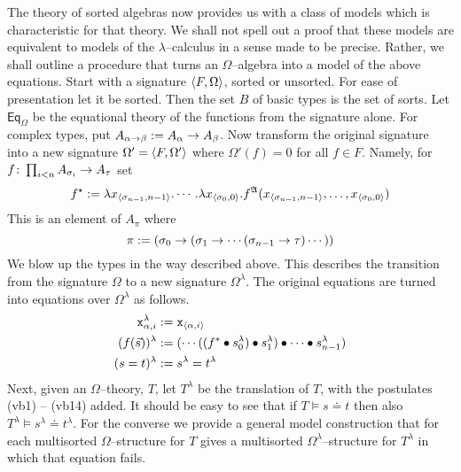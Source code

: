 The theory of sorted algebras now provides us with a class of models 
which is characteristic for that theory. We shall not spell out a 
proof that these models are equivalent to models of the $\lambda$--calculus 
in a sense made to be precise. Rather, we shall outline a procedure 
that turns an $\Omega$--algebra into a model of the above equations.
Start with a signature $\langle F, \Omega\rangle$, sorted or unsorted. For ease 
of presentation let it be sorted. Then the set $B$ of basic types is the 
set of sorts. Let $\mathsf{Eq}_{\Omega}$ be the equational theory 
of the functions from the signature alone. For complex types, put 
$A_{\alpha\rightarrow\beta} := A_{\alpha} \rightarrow A_{\beta}$. Now transform 
the original signature into a new signature $\Omega' = \langle F, 
\Omega'\rangle$ where $\Omega'(f) = 0$ for all $f \in F$. Namely, for 
$f \colon \prod_{i < n} A_{\sigma_i} \rightarrow A_{\tau}$ set 
\begin{equation}
f^{\star} := \lambda x_{\langle \sigma_{n-1}, n-1\rangle}.\dotsb .\lambda 
x_{\langle \sigma_0, 0\rangle}. f^{\mathfrak{A}}(x_{\langle \sigma_{n-1}, n-1\rangle},\dotsc, 
x_{\langle \sigma_0, 0\rangle})
\end{equation}
This is an element of $A_{\pi}$ where 
\begin{equation}
\pi := (\sigma_0 \rightarrow (\sigma_1 \rightarrow \dotsb (\sigma_{n -1} 
\rightarrow \tau)\dotsb ))
\end{equation}
We blow up the types in the way described above. 
This describes the transition from the signature $\Omega$ to a new 
signature $\Omega^{\lambda}$. The original equations are turned into 
equations over $\Omega^{\lambda}$ as follows. 
\begin{subequations}
\begin{align}
\mbox{\tt x}_{\alpha, i}^{\lambda} & := \mbox{\tt x}_{\langle \alpha, i\rangle} \\
(f(\vec{s}))^{\lambda} & := 
	(\dotsb ((f^{\ast} \bullet s_0^{\lambda}) \bullet 
s_1^{\lambda}) \bullet \dotsb \bullet s^{\lambda}_{n-1}) \\
(s = t)^{\lambda} & := s^{\lambda} = t^{\lambda} 
\end{align}
\end{subequations}
Next, given an $\Omega$--theory, $T$, let $T^{\lambda}$ be the 
translation of $T$, with the postulates (vb1) -- (vb14) added. 
It should be easy to see that if $T \vDash s \boldsymbol{\doteq} t$ 
then also $T^{\lambda} \vDash s^{\lambda} \boldsymbol{\doteq} t^{\lambda}$. 
For the converse we provide a general model construction that for each 
multisorted $\Omega$--structure for $T$ gives a multisorted 
$\Omega^{\lambda}$--structure for $T^{\lambda}$ in which that 
equation fails. 

